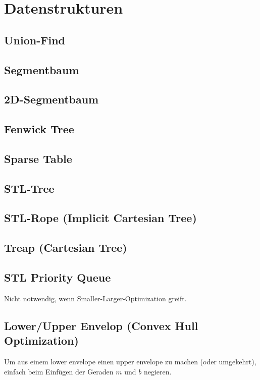 \section{Datenstrukturen}

\subsection{Union-Find}


\subsection{Segmentbaum}


\subsection{2D-Segmentbaum}


\subsection{Fenwick Tree}



\subsection{Sparse Table}


\subsection{STL-Tree}


\subsection{STL-Rope (Implicit Cartesian Tree)}


\subsection{Treap (Cartesian Tree)}


\subsection{STL Priority Queue}
Nicht notwendig, wenn Smaller-Larger-Optimization greift.


\subsection{Lower/Upper Envelop (Convex Hull Optimization)}
Um aus einem lower envelope einen upper envelope zu machen (oder umgekehrt), einfach beim Einfügen der Geraden $m$ und $b$ negieren.


